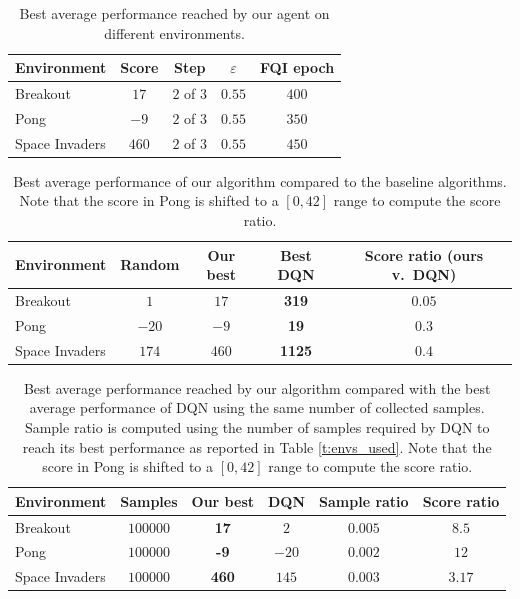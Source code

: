 %
\begin{table}
    \centering
    \begin{tabular}{l c c c c} 
	\hline
	Environment    & Score    & Step       & $\varepsilon$ & FQI epoch  \\ 
	\hline 
	Breakout       & $17$     & $2$ of $3$ & $0.55$        & $400$     \\
	Pong           & $-9$     & $2$ of $3$ & $0.55$        & $350$     \\
	Space Invaders & $460$    & $2$ of $3$ & $0.55$        & $450$     \\
	\hline
    \end{tabular}
    \caption[Performance of our algorithm]{Best average performance reached by 
	    our agent on different environments.}
    \label{t:avg_performance_only_ours}
\end{table}
%
%
\begin{table}
    \centering
    \begin{tabular}{l c c c c} 
	\hline
	Environment    & Random   & Our best & Best DQN      & Score ratio (ours v.\ DQN) \\ 
	\hline 
	Breakout       & $1$      & $17$     & \textbf{319}  & $0.05$                     \\
	Pong           & $-20$    & $-9$     & \textbf{19}   & $0.3$                      \\
	Space Invaders & $174$    & $460$    & \textbf{1125} & $0.4$                      \\
	\hline
    \end{tabular}
    \caption[Performance of our algorithm w.r.t. the baselines]{Best average 
	     performance of our algorithm compared to the baseline algorithms.
	     Note that the score in Pong is shifted to a $[0, 42]$ range to 
	     compute the score ratio.}
    \label{t:avg_performance_main}
\end{table}
%
%
\begin{table}
    \centering
    \begin{tabular}{l c c c c c} 
	\hline
	Environment    & Samples  & Our best      & DQN    & Sample ratio   & Score ratio \\
	\hline 
	Breakout       & $100000$ & \textbf{17}   & $2$    & $0.005$        & $8.5$\\
	Pong           & $100000$ & \textbf{-9}   & $-20$  & $0.002$        & $12$\\
	Space Invaders & $100000$ & \textbf{460}  & $145 $ & $0.003$        & $3.17$\\
	\hline
    \end{tabular}
    \caption[Sample efficiency of our algorithm]{Best average performance 
	    reached by our algorithm compared with the best average performance
	    of DQN using the same number of collected samples. 
	    Sample ratio is computed using the number of samples required by DQN
	    to reach its best performance as reported in Table \ref{t:envs_used}.
	    Note that the score in Pong is shifted to a $[0, 42]$ range to 
	    compute the score ratio.}
    \label{t:sample_efficiency_main}
\end{table}
%
    




